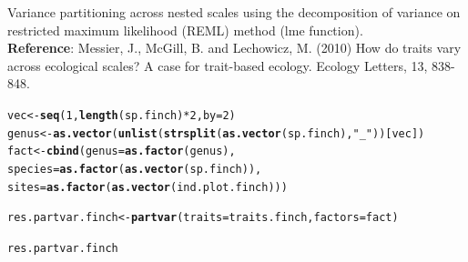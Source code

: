 \documentclass[12pt]{article}\usepackage[]{graphicx}\usepackage[]{color}
\makeatletter
\newcommand{\hlnum}[1]{\textcolor[rgb]{0.686,0.059,0.569}{#1}}%
\newcommand{\hlstr}[1]{\textcolor[rgb]{0.192,0.494,0.8}{#1}}%
\newcommand{\hlopt}[1]{\textcolor[rgb]{0,0,0}{#1}}%
\newcommand{\hlstd}[1]{\textcolor[rgb]{0.345,0.345,0.345}{#1}}%
\newcommand{\hlkwb}[1]{\textcolor[rgb]{0.69,0.353,0.396}{#1}}%
\newcommand{\hlkwc}[1]{\textcolor[rgb]{0.333,0.667,0.333}{#1}}%
\newcommand{\hlkwd}[1]{\textcolor[rgb]{0.737,0.353,0.396}{\textbf{#1}}}%
\newenvironment{kframe}{%
 \def\at@end@of@kframe{}%
 \ifinner\ifhmode%
  \def\at@end@of@kframe{\end{minipage}}%
  \begin{minipage}{\columnwidth}%
 \fi\fi%
 \def\FrameCommand##1{\hskip\@totalleftmargin \hskip-\fboxsep
 \colorbox{shadecolor}{##1}\hskip-\fboxsep
     \hskip-\linewidth \hskip-\@totalleftmargin \hskip\columnwidth}%
 \MakeFramed {\advance\hsize-\width
   \@totalleftmargin\z@ \linewidth\hsize
   \@setminipage}}%
 {\par\unskip\endMakeFramed%
 \at@end@of@kframe}
\newenvironment{knitrout}{}{} %
\makeatother
\begin{document}
Variance partitioning across nested scales using the decomposition of variance on restricted maximum likelihood (REML) method (lme function).
\\

\textbf{Reference}: Messier, J., McGill, B. and Lechowicz, M. (2010) How do traits vary across ecological scales? A case for trait-based ecology. Ecology Letters, 13, 838-848.

\begin{knitrout}
\color{fgcolor}\begin{kframe}
\begin{alltt}
\hlstd{vec}\hlkwb{<-} \hlkwd{seq}\hlstd{(}\hlnum{1}\hlstd{,}\hlkwd{length}\hlstd{(sp.finch)}\hlopt{*}\hlnum{2}\hlstd{,} \hlkwc{by} \hlstd{=} \hlnum{2}\hlstd{)}
\hlstd{genus}\hlkwb{<-}\hlkwd{as.vector}\hlstd{(}\hlkwd{unlist}\hlstd{(}\hlkwd{strsplit}\hlstd{(}\hlkwd{as.vector}\hlstd{(sp.finch),}\hlstr{"_"}\hlstd{))[vec])}
\hlstd{fact}\hlkwb{<-}\hlkwd{cbind}\hlstd{(}\hlkwc{genus} \hlstd{=} \hlkwd{as.factor}\hlstd{(genus),}
      \hlkwc{species} \hlstd{=} \hlkwd{as.factor}\hlstd{(}\hlkwd{as.vector}\hlstd{(sp.finch)),}
      \hlkwc{sites} \hlstd{=} \hlkwd{as.factor}\hlstd{(}\hlkwd{as.vector}\hlstd{(ind.plot.finch)))}

\hlstd{res.partvar.finch}\hlkwb{<-}\hlkwd{partvar}\hlstd{(}\hlkwc{traits} \hlstd{= traits.finch,} \hlkwc{factors} \hlstd{= fact)}

\hlstd{res.partvar.finch}
\end{alltt}
\end{kframe}
\end{knitrout}
\end{document}
